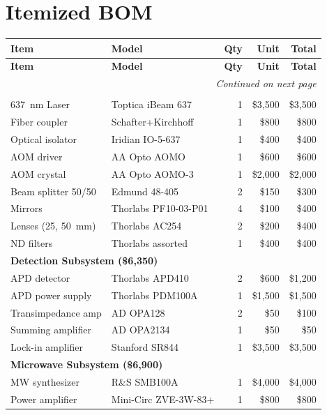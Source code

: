 \documentclass[11pt,a4paper,openany]{book}
\begin{document}
\section{Itemized BOM}

\begin{longtable}{p{4.2cm}lrrr}
\toprule
\textbf{Item} & \textbf{Model} & \textbf{Qty} & \textbf{Unit} & \textbf{Total} \\
\midrule
\endfirsthead
\toprule
\textbf{Item} & \textbf{Model} & \textbf{Qty} & \textbf{Unit} & \textbf{Total} \\
\midrule
\endhead
\midrule
\multicolumn{5}{r}{\textit{Continued on next page}} \\
\bottomrule
\endfoot
\bottomrule
\endlastfoot
\multicolumn{5}{l}{\textbf{Optical Subsystem (\$8,800)}} \\
\midrule
637~nm Laser & Toptica iBeam 637 & 1 & \$3,500 & \$3,500 \\
Fiber coupler & Schafter+Kirchhoff & 1 & \$800 & \$800 \\
Optical isolator & Iridian IO-5-637 & 1 & \$400 & \$400 \\
AOM driver & AA Opto AOMO & 1 & \$600 & \$600 \\
AOM crystal & AA Opto AOMO-3 & 1 & \$2,000 & \$2,000 \\
Beam splitter 50/50 & Edmund 48-405 & 2 & \$150 & \$300 \\
Mirrors & Thorlabs PF10-03-P01 & 4 & \$100 & \$400 \\
Lenses (25, 50~mm) & Thorlabs AC254 & 2 & \$200 & \$400 \\
ND filters & Thorlabs assorted & 1 & \$400 & \$400 \\
\midrule
\multicolumn{5}{l}{\textbf{Detection Subsystem (\$6,350)}} \\
\midrule
APD detector & Thorlabs APD410 & 2 & \$600 & \$1,200 \\
APD power supply & Thorlabs PDM100A & 1 & \$1,500 & \$1,500 \\
Transimpedance amp & AD OPA128 & 2 & \$50 & \$100 \\
Summing amplifier & AD OPA2134 & 1 & \$50 & \$50 \\
Lock-in amplifier & Stanford SR844 & 1 & \$3,500 & \$3,500 \\
\midrule
\multicolumn{5}{l}{\textbf{Microwave Subsystem (\$6,900)}} \\
\midrule
MW synthesizer & R\&S SMB100A & 1 & \$4,000 & \$4,000 \\
Power amplifier & Mini-Circ ZVE-3W-83+ & 1 & \$800 & \$800 \\

\end{longtable}
\end{document}
